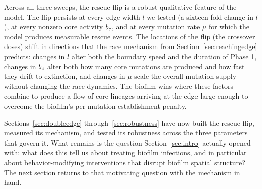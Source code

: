 Across all three sweeps, the rescue flip is a robust qualitative feature of the model. The flip persists at every edge width $l$ we tested (a sixteen-fold change in $l$), at every nonzero core activity $b_c$, and at every mutation rate $\mu$ for which the model produces measurable rescue events. The locations of the flip (the crossover doses) shift in directions that the race mechanism from Section~\ref{sec:reachingedge} predicts: changes in $l$ alter both the boundary speed and the duration of Phase 1, changes in $b_c$ alter both how many core mutations are produced and how fast they drift to extinction, and changes in $\mu$ scale the overall mutation supply without changing the race dynamics. The biofilm wins where these factors combine to produce a flow of core lineages arriving at the edge large enough to overcome the biofilm's per-mutation establishment penalty.

Sections~\ref{sec:doubleedge} through~\ref{sec:robustness} have now built the rescue flip, measured its mechanism, and tested its robustness across the three parameters that govern it. What remains is the question Section~\ref{sec:intro} actually opened with: what does this tell us about treating biofilm infections, and in particular about behavior-modifying interventions that disrupt biofilm spatial structure? The next section returns to that motivating question with the mechanism in hand.
